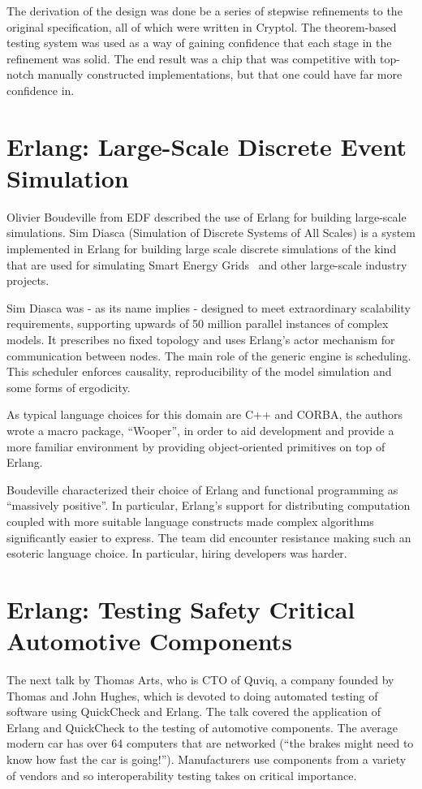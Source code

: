 \documentclass{jfp1}
\begin{document}
The derivation of the design was done be a series of stepwise
refinements to the original specification, all of which were written in
Cryptol.  The theorem-based testing system was used as a way of gaining
confidence that each stage in the refinement was solid.  The end result
was a chip that was competitive with top-notch manually constructed
implementations, but that one could have far more confidence in.

\section{Erlang: Large-Scale Discrete Event Simulation}

Olivier Boudeville from EDF described the use of Erlang for building
large-scale simulations.  Sim Diasca (Simulation of Discrete Systems of
All Scales) is a system implemented in Erlang for building large scale
discrete simulations of the kind that are used for simulating Smart
Energy Grids~\cite{x} and other large-scale industry projects.

Sim Diasca was - as its name implies - designed to meet extraordinary
scalability requirements, supporting upwards of 50 million parallel
instances of complex models.  It prescribes no fixed topology and uses
Erlang's actor mechanism for communication between nodes.  The main role
of the generic engine is scheduling.  This scheduler enforces causality,
reproducibility of the model simulation and some forms of ergodicity.

As typical language choices for this domain are C++ and CORBA, the
authors wrote a macro package, ``Wooper'', in order to aid development
and provide a more familiar environment by providing object-oriented
primitives on top of Erlang.

Boudeville characterized their choice of Erlang and functional
programming as ``massively positive''.  In particular, Erlang's support
for distributing computation coupled with more suitable language
constructs made complex algorithms significantly easier to express.  The
team did encounter resistance making such an esoteric language choice.
In particular, hiring developers was harder.

\section{Erlang: Testing Safety Critical Automotive Components}

The next talk by Thomas Arts, who is CTO of Quviq, a company founded by
Thomas and John Hughes, which is devoted to doing automated testing of
software using QuickCheck and Erlang.  The talk covered the application
of Erlang and QuickCheck to the testing of automotive components.  The
average modern car has over 64 computers that are networked (``the
brakes might need to know how fast the car is going!'').  Manufacturers
use components from a variety of vendors and so interoperability testing
takes on critical importance.
\end{document}
